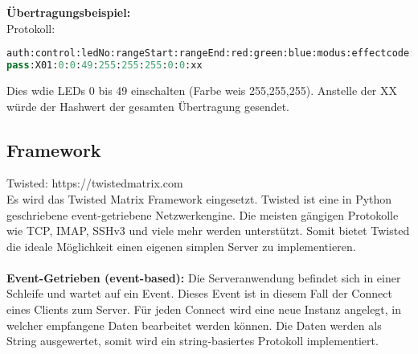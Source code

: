 \textbf{Übertragungsbeispiel:}\\
		Protokoll:
\begin{lstlisting}[caption = Beispielübertragung des Protokolls, language=python, frame=single, breaklines=true,columns=fullflexible, commentstyle=\color{gray}\upshape, captionpos=b]
auth:control:ledNo:rangeStart:rangeEnd:red:green:blue:modus:effectcode:hash
pass:X01:0:0:49:255:255:255:0:0:xx
\end{lstlisting}
Dies w die LEDs 0 bis 49 einschalten (Farbe weis 255,255,255). Anstelle der XX würde der Hashwert der gesamten Übertragung gesendet.
\subsection{Framework}
Twisted: https://twistedmatrix.com \\
Es wird das Twisted Matrix Framework eingesetzt. Twisted ist eine in Python geschriebene  event-getriebene Netzwerkengine. Die meisten gängigen Protokolle wie TCP, IMAP, SSHv3 und viele mehr werden unterstützt. Somit bietet Twisted die ideale Möglichkeit einen eigenen simplen Server zu implementieren. \\\\
\textbf{Event-Getrieben (event-based):} Die Serveranwendung befindet sich in einer Schleife und wartet auf ein Event. Dieses Event ist in diesem Fall der Connect eines Clients zum Server. Für jeden Connect wird eine neue Instanz angelegt, in welcher empfangene Daten bearbeitet werden können. Die Daten werden als String ausgewertet, somit wird ein string-basiertes Protokoll implementiert. \cite{eventbased}

